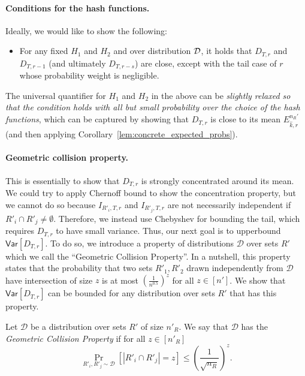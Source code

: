\paragraph{Conditions for the hash functions.}
Ideally, we would like to show the following:
\begin{itemize}
    \item[]  For any fixed $H_1$ and $H_2$ and over distribution ${\cal D}$, it holds that $D_{T, r}$ and $D_{T, r-1}$ (and ultimately $D_{T, r-s}$) are close, except with the tail case of $r$ whose  probability weight is negligible.   
\end{itemize}

The universal quantifier for $H_1$ and $H_2$ in the above can be
{\em slightly relaxed so that the condition holds with all but small
probability over the choice of the hash functions}, which can be captured
by showing that $D_{T,r}$ is close to its mean $E_{\hat k,r}^{n_R'}$
(and then applying Corollary~\ref{lem:concrete_expected_probs}). 
%


\paragraph{Geometric collision property.}
This is essentially to show that $D_{T,r}$ is strongly concentrated around its
mean. We could try to apply Chernoff bound to show the concentration
property, but we cannot do so because $I_{R'_i, T, r}$ and $I_{R'_j, T, r}$
are not necessarily independent if $R'_i \cap R'_j \neq \emptyset$.
Therefore, we instead use Chebyshev for bounding the tail, which
requires $D_{T,r}$ to have small variance.  Thus, our next goal is to
upperbound $\mathsf{Var}[D_{T,r}]$.
%
To do so, we introduce a property of distributions $\mathcal{D}$ over
sets $R'$ which we call the ``Geometric Collision Property''.  In a
nutshell, this property states that the probability that two sets $R'_1,
R'_2$ drawn independently from $\mathcal{D}$ have intersection of size
$z$ is at most 
$(\frac{1}{n^{0.5}})^z$ for all $z \in [n']$.  We show that
$\mathsf{Var}[D_{T,r}]$ can be bounded for any distribution over sets $R'$
that has this property.


\begin{definition}\label{def:geo_col} Let
$\mathcal{D}$ be a distribution over sets $R'$ of size
$n'_R$.  We say that ${\mathcal{D}}$ has the \emph{Geometric Collision
Property} if for all $z \in [n'_R]$
\[
\Pr_{R'_i, R'_j \sim {\mathcal{D}}} \left [|R'_i \cap R'_j| = z \right ] \leq \left ( \frac{1}{\sqrt{n_R}} \right)^z.
\]
\end{definition}

